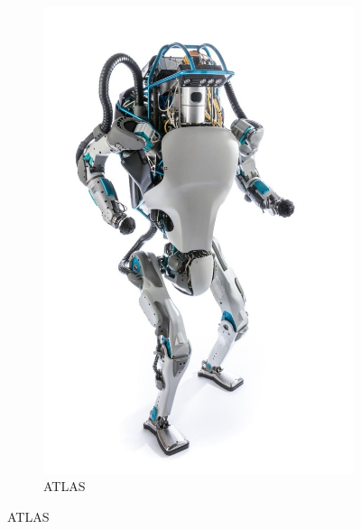 \begin{figure}[h]
\begin{subfigure}[b]{0.32\textwidth}
        \includegraphics[width=\textwidth]{figures/biped_atlas.jpg}
        \caption{ATLAS}
        \label{fig:atlas}
    \end{subfigure}
\end{figure}







